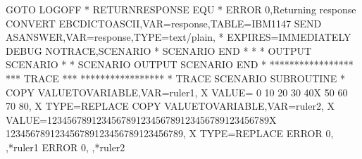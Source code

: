 \documentclass[letterpaper,10pt,english]{sphinxmanual}
\begin{document}
\begin{sphinxVerbatim}[commandchars=\\\{\}]
   GOTO\PYGZdl{} LOGOFF
*
RETURN\PYGZus{}RESPONSE EQU *
   ERROR\PYGZdl{} 0,\PYGZsq{}Returning response\PYGZsq{}
   CONVERT\PYGZdl{} EBCDIC\PYGZhy{}TO\PYGZhy{}ASCII,VAR=\PYGZsq{}response\PYGZsq{},TABLE=\PYGZsq{}IBM1147\PYGZsq{}
   SEND\PYGZdl{} AS\PYGZhy{}ANSWER,VAR=\PYGZsq{}response\PYGZsq{},TYPE=\PYGZsq{}text/plain\PYGZsq{},             *
         EXPIRES=IMMEDIATELY
   DEBUG\PYGZdl{} NOTRACE,SCENARIO
*
   SCENARIO END
*
*\PYGZsh{}\PYGZsh{}\PYGZsh{}\PYGZsh{}\PYGZsh{}\PYGZsh{}\PYGZsh{}\PYGZsh{}\PYGZsh{}\PYGZsh{}\PYGZsh{}\PYGZsh{}\PYGZsh{}\PYGZsh{}\PYGZsh{}\PYGZsh{}\PYGZsh{}\PYGZsh{}\PYGZsh{}\PYGZsh{}\PYGZsh{}\PYGZsh{}\PYGZsh{}\PYGZsh{}\PYGZsh{}\PYGZsh{}\PYGZsh{}\PYGZsh{}\PYGZsh{}\PYGZsh{}\PYGZsh{}\PYGZsh{}\PYGZsh{}\PYGZsh{}\PYGZsh{}\PYGZsh{}\PYGZsh{}\PYGZsh{}\PYGZsh{}\PYGZsh{}\PYGZsh{}\PYGZsh{}\PYGZsh{}\PYGZsh{}\PYGZsh{}\PYGZsh{}\PYGZsh{}\PYGZsh{}\PYGZsh{}\PYGZsh{}\PYGZsh{}\PYGZsh{}\PYGZsh{}\PYGZsh{}\PYGZsh{}\PYGZsh{}\PYGZsh{}\PYGZsh{}\PYGZsh{}\PYGZsh{}\PYGZsh{}\PYGZsh{}\PYGZsh{}\PYGZsh{}\PYGZsh{}\PYGZsh{}\PYGZsh{}\PYGZsh{}\PYGZsh{}\PYGZsh{}
*\PYGZsh{}\PYGZsh{}                        OUTPUT SCENARIO                           \PYGZsh{}\PYGZsh{}
*\PYGZsh{}\PYGZsh{}\PYGZsh{}\PYGZsh{}\PYGZsh{}\PYGZsh{}\PYGZsh{}\PYGZsh{}\PYGZsh{}\PYGZsh{}\PYGZsh{}\PYGZsh{}\PYGZsh{}\PYGZsh{}\PYGZsh{}\PYGZsh{}\PYGZsh{}\PYGZsh{}\PYGZsh{}\PYGZsh{}\PYGZsh{}\PYGZsh{}\PYGZsh{}\PYGZsh{}\PYGZsh{}\PYGZsh{}\PYGZsh{}\PYGZsh{}\PYGZsh{}\PYGZsh{}\PYGZsh{}\PYGZsh{}\PYGZsh{}\PYGZsh{}\PYGZsh{}\PYGZsh{}\PYGZsh{}\PYGZsh{}\PYGZsh{}\PYGZsh{}\PYGZsh{}\PYGZsh{}\PYGZsh{}\PYGZsh{}\PYGZsh{}\PYGZsh{}\PYGZsh{}\PYGZsh{}\PYGZsh{}\PYGZsh{}\PYGZsh{}\PYGZsh{}\PYGZsh{}\PYGZsh{}\PYGZsh{}\PYGZsh{}\PYGZsh{}\PYGZsh{}\PYGZsh{}\PYGZsh{}\PYGZsh{}\PYGZsh{}\PYGZsh{}\PYGZsh{}\PYGZsh{}\PYGZsh{}\PYGZsh{}\PYGZsh{}\PYGZsh{}\PYGZsh{}
*
   SCENARIO OUTPUT
   SCENARIO END
*
*****************
***   TRACE   ***
*****************
*
TRACE    SCENARIO SUBROUTINE
*
   COPY\PYGZdl{} VALUE\PYGZhy{}TO\PYGZhy{}VARIABLE,VAR=\PYGZsq{}ruler1\PYGZsq{},                         X
         VALUE=\PYGZsq{}\PYGZhy{}\PYGZhy{}\PYGZhy{}  0\PYGZhy{}\PYGZhy{}\PYGZhy{}\textbar{}\PYGZhy{}\PYGZhy{}\PYGZhy{} 10\PYGZhy{}\PYGZhy{}\PYGZhy{}\textbar{}\PYGZhy{}\PYGZhy{}\PYGZhy{} 20\PYGZhy{}\PYGZhy{}\PYGZhy{}\textbar{}\PYGZhy{}\PYGZhy{}\PYGZhy{} 30\PYGZhy{}\PYGZhy{}\PYGZhy{}\textbar{}\PYGZhy{}\PYGZhy{}\PYGZhy{} 40\PYGZhy{}\PYGZhy{}\PYGZhy{}X
         \textbar{}\PYGZhy{}\PYGZhy{}\PYGZhy{} 50\PYGZhy{}\PYGZhy{}\PYGZhy{}\textbar{}\PYGZhy{}\PYGZhy{}\PYGZhy{} 60\PYGZhy{}\PYGZhy{}\PYGZhy{}\textbar{}\PYGZhy{}\PYGZhy{}\PYGZhy{} 70\PYGZhy{}\PYGZhy{}\PYGZhy{}\textbar{}\PYGZhy{}\PYGZhy{}\PYGZhy{} 80\PYGZhy{}\PYGZhy{}\PYGZhy{}\textbar{}\PYGZsq{},             X
         TYPE=REPLACE
   COPY\PYGZdl{} VALUE\PYGZhy{}TO\PYGZhy{}VARIABLE,VAR=\PYGZsq{}ruler2\PYGZsq{},                         X
         VALUE=\PYGZsq{}123456789\textbar{}123456789\textbar{}123456789\textbar{}123456789\textbar{}123456789X
         \textbar{}123456789\textbar{}123456789\textbar{}123456789\textbar{}123456789\textbar{}\PYGZsq{},             X
         TYPE=REPLACE
   ERROR\PYGZdl{} 0,\PYGZsq{}          \PYGZsq{},\PYGZsq{}*ruler1\PYGZsq{}
   ERROR\PYGZdl{} 0,\PYGZsq{}          \PYGZsq{},\PYGZsq{}*ruler2\PYGZsq{}


\end{sphinxVerbatim}
\end{document}
